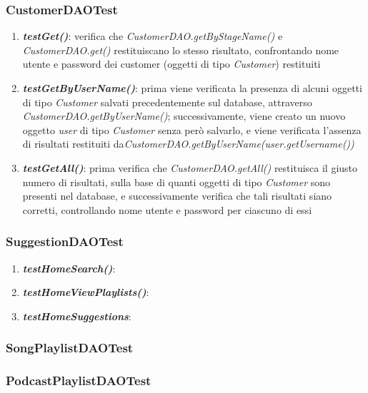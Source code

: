 \documentclass{article}
\begin{document}
  \subsubsection{CustomerDAOTest}
  \begin{enumerate}

    \item \textbf{\textit{testGet()}}: verifica che \textit{CustomerDAO.getByStageName()} e \textit{CustomerDAO.get()} restituiscano lo stesso risultato, confrontando nome utente e password dei customer (oggetti di tipo \textit{Customer}) restituiti

    \item \textbf{\textit{testGetByUserName()}}: prima viene verificata la presenza di alcuni oggetti di tipo \textit{Customer} salvati precedentemente sul database, attraverso \textit{CustomerDAO.getByUserName()}; successivamente, viene creato un nuovo oggetto \textit{user} di tipo \textit{Customer} senza però salvarlo, e viene verificata l'assenza di risultati restituiti da\textit{CustomerDAO.getByUserName(user.getUsername())}

    \item \textbf{\textit{testGetAll()}}: prima verifica che \textit{CustomerDAO.getAll()} restituisca il giusto numero di risultati, sulla base di quanti oggetti di tipo \textit{Customer} sono presenti nel database, e successivamente verifica che tali risultati siano corretti, controllando nome utente e password per ciascuno di essi

  \end{enumerate}

  \subsubsection{SuggestionDAOTest}
  \begin{enumerate}
    \item \textbf{\textit{testHomeSearch()}}:
    \item \textbf{\textit{testHomeViewPlaylists()}}:
    \item \textbf{\textit{testHomeSuggestions}}:
  \end{enumerate}

  \subsubsection{SongPlaylistDAOTest}

  \subsubsection{PodcastPlaylistDAOTest}
\end{document}
